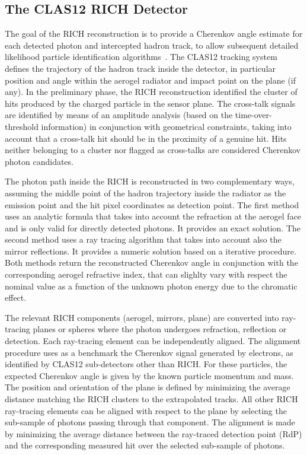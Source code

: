 \subsection{The CLAS12 RICH Detector}

The goal of the RICH reconstruction is to provide a Cherenkov angle estimate for each detected photon and intercepted hadron track, to allow subsequent detailed likelihood particle identification algorithms~\cite{rich-nim}. The CLAS12 tracking system defines the trajectory of the hadron track inside the detector, in particular position and angle within the aerogel radiator and impact point on the \MaPMT plane (if any). In the preliminary phase, the RICH reconstruction identified the cluster of hits produced by the charged particle in the sensor plane. The cross-talk signals are identified by means of an amplitude analysis (based on the time-over-threshold information) in conjunction with geometrical constraints, taking into account that a cross-talk hit should be in the proximity of a genuine hit. Hits neither belonging to a cluster nor flagged as cross-talks are considered Cherenkov photon candidates. 

The photon path inside the RICH is reconstructed in two complementary ways, assuming the middle point of the hadron trajectory inside the radiator as the emission point and the hit pixel coordinates as detection point. The first method uses an analytic formula that takes into account the refraction at the aerogel face and is only valid for directly detected photons. It provides an exact solution. The second method uses a ray tracing algorithm that takes into account also the mirror reflections. It provides a numeric solution based on a iterative procedure. Both methods return the reconstructed Cherenkov angle in conjunction with the corresponding aerogel refractive index, that can slighlty vary with respect the nominal value as a function of the unknown photon energy due to the chromatic effect. 

The relevant RICH components (aerogel, mirrors, \MaPMT plane) are converted into ray-tracing planes or spheres where the photon undergoes refraction, reflection or detection. Each ray-tracing element can be independently aligned. The alignment procedure uses as a benchmark the Cherenkov signal generated by electrons, as identified by CLAS12 sub-detectors other than RICH. For these particles, the expected Cherenkov angle is given by the known particle momentum and mass. The position and orientation of the \MaPMT plane is defined by minimizing the average distance matching the RICH clusters to the extrapolated tracks. All other RICH ray-tracing elements can be aligned with respect to the \MaPMT plane by selecting the sub-sample of photons passing through that component. The alignment is made by minimizing the average distance between the ray-traced detection point (RdP) and the corresponding measured \MaPMT hit over the selected sub-sample of photons.

